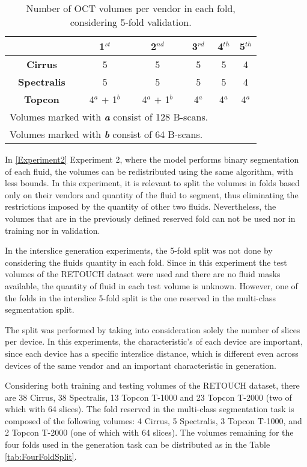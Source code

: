 \begin{table*}[!ht]
	\setlength{\tabcolsep}{6pt}
	\renewcommand{\arraystretch}{1.3}
	\caption{Number of OCT volumes per vendor in each fold, considering 5-fold validation.}
	\centering
	\begin{tabular}{|c|c|c|c|c|c|}
		\hline
		& \textbf{1$^{st}$} & \textbf{2$^{nd}$} & \textbf{3$^{rd}$} & \textbf{4$^{th}$} & \textbf{5$^{th}$} \\
		\hline
		\textbf{Cirrus} & 5 & 5 & 5 & 5 & 4 \\
		\textbf{Spectralis} & 5 & 5 & 5 & 5 & 4 \\
		\textbf{Topcon} & 4$^{a}$ + 1$^{b}$ & 4$^{a}$ + 1$^{b}$ & 4$^{a}$ & 4$^{a}$ & 4$^{a}$ \\
		\hline
		\multicolumn{4}{l}{Volumes marked with \textbf{\textit{a}} consist of 128 B-scans.} \\
		\multicolumn{4}{l}{Volumes marked with \textbf{\textit{b}} consist of 64 B-scans.}
	\end{tabular}
	\label{tab:FiveFoldSplit}
\end{table*}

In \ref{Experiment2} Experiment 2, where the model performs binary segmentation of each fluid, the volumes can be redistributed using the same algorithm, with less bounds. In this experiment, it is relevant to split the volumes in folds based only on their vendors and quantity of the fluid to segment, thus eliminating the restrictions imposed by the quantity of other two fluids. Nevertheless, the volumes that are in the previously defined reserved fold can not be used nor in training nor in validation.
\par
In the interslice generation experiments, the 5-fold split was not done by considering the fluids quantity in each fold. Since in this experiment the test volumes of the RETOUCH dataset were used and there are no fluid masks available, the quantity of fluid in each test volume is unknown. However, one of the folds in the interslice 5-fold split is the one reserved in the multi-class segmentation split.
\par
The split was performed by taking into consideration solely the number of slices per device. In this experiments, the characteristic's of each device are important, since each device has a specific interslice distance, which is different even across devices of the same vendor and an important characteristic in generation.
\par
Considering both training and testing volumes of the RETOUCH dataset, there are 38 Cirrus, 38 Spectralis, 13 Topcon T-1000 and 23 Topcon T-2000 (two of which with 64 slices). The fold reserved in the multi-class segmentation task is composed of the following volumes: 4 Cirrus, 5 Spectralis, 3 Topcon T-1000, and 2 Topcon T-2000 (one of which with 64 slices). The volumes remaining for the four folds used in the generation task can be distributed as in the Table \ref{tab:FourFoldSplit}.

